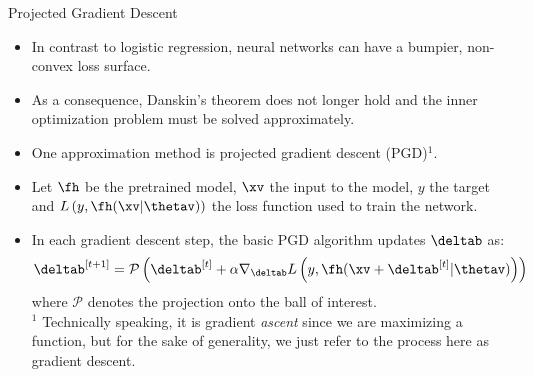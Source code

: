 \documentclass[11pt,compress,t,notes=noshow, xcolor=table]{beamer}
\begin{document}
 \begin{vbframe}{Projected Gradient Descent}
    \begin{itemize}
       \item In contrast to logistic regression, neural networks can have a bumpier, 
       non-convex loss surface.     
       \item As a consequence, Danskin's theorem does not longer hold and the inner optimization problem must be solved approximately. 
       \item One approximation method is projected gradient descent (PGD)$^1$.
        \item Let $\fh$ be the pretrained model, $\xv$ the input to the model, $y$ the target and $L\left(y, \fh(\xv | \thetav) \right)$ the loss function used to train the network.
        \item In each gradient descent step, the basic PGD algorithm updates $\deltab$ as: 
        \begin{equation*}
            \deltab^{[t+1]} = \mathcal{P}\left(\deltab^{[t]} + \alpha \nabla_{\deltab} L\left(y, \fh(\xv + \deltab^{[t]}| \thetav) \right) \right)
        \end{equation*}
        where $\mathcal{P}$ denotes the projection onto the ball of interest. \\
        \lz
        {\scriptsize $^1$ Technically speaking, it is gradient \textit{ascent} since we are maximizing a function, but for the sake of generality, we just refer to the process here as gradient descent.}


        

\end{itemize}
\end{vbframe}
\end{document}
